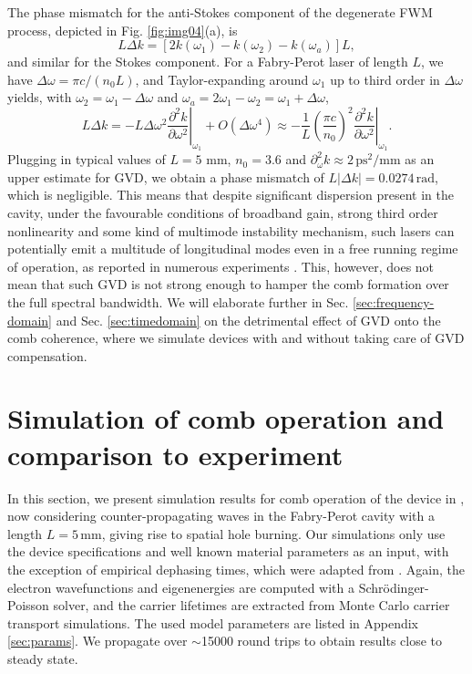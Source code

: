 \documentclass[10pt]{article}
\begin{document}
	The phase mismatch for the anti-Stokes component of the degenerate FWM
	process, depicted in Fig. \ref{fig:img04}(a), is \cite{butcher1991elements}
	\begin{equation}
		L\Delta k=\left[  2k(\omega_{1})-k(\omega_{2})-k(\omega_{a})\right]  L,
	\end{equation}
	and similar for the Stokes component. For a Fabry-Perot laser of length $L$,
	we have $\Delta\omega=\pi c/\left(  n_{0}L\right)  $, and Taylor-expanding
	around $\omega_{1}$ up to third order in $\Delta\omega$ yields, with
	$\omega_{2}=\omega_{1}-\Delta\omega$ and $\omega_{a}=2\omega_{1}-\omega
	_{2}=\omega_{1}+\Delta\omega$,
	\begin{equation}
		L\Delta k=-L\Delta\omega^{2}\left.  \frac{\partial^{2}k}{\partial\omega^{2}%
		}\right|  _{\omega_{1}}+O(\Delta\omega^{4})\approx-\frac{1}{L}\left(
		\frac{\pi c}{n_{0}}\right)  ^{2}\left.  \frac{\partial^{2}k}{\partial
			\omega^{2}}\right|  _{\omega_{1}}.\label{eq:phasemismatch}
	\end{equation}
	Plugging in typical values of $L=5$ mm, $n_{0}=3.6$ and $\partial_{\omega}%
	^{2}k\approx2{\,}\mathrm{ps}^{2}/\mathrm{mm}$ as an upper estimate for GVD, we
	obtain a phase mismatch of $L\left|  \Delta k\right|  =0.0274{\,}\mathrm{rad}%
	$, which is negligible. This means that despite significant dispersion present
	in the cavity, under the favourable conditions of broadband gain, strong third
	order nonlinearity and some kind of multimode instability mechanism, such
	lasers can potentially emit a multitude of longitudinal modes even in a free
	running regime of operation, as reported in numerous experiments
	\cite{wienold2014evidence,burghoff2014terahertz,hugi2012mid,rosch2015octave}. 
	This, however, does not mean that such GVD is not strong enough to hamper the comb formation 
	over the full spectral bandwidth. We will elaborate further in Sec. \ref{sec:frequency-domain} and Sec. \ref{sec:timedomain} 
	on the detrimental effect of GVD onto the comb coherence, where we simulate devices with and without taking care of GVD compensation.  	
	
	\section{Simulation of comb operation and comparison to experiment}
	\label{sec:tdsims}
	In this section, we present simulation results for comb operation of the
	device in \cite{burghoff2014terahertz}, now considering counter-propagating
	waves in the Fabry-Perot cavity with a length $L=5{\,}\mathrm{mm}$, giving
	rise to spatial hole burning. Our simulations only use the device
	specifications and well known material parameters as an input, with the
	exception of empirical dephasing times, which were adapted from  \cite{dupont2010simplified}. Again, the electron wavefunctions and
	eigenenergies are computed with a Schr{\"{o}}dinger-Poisson solver, and the
	carrier lifetimes are extracted from Monte Carlo carrier transport
	simulations. The used model parameters are listed in Appendix \ref{sec:params}. 
	We propagate over $\sim$15000 round trips to obtain results close to steady state.
	
\end{document}
